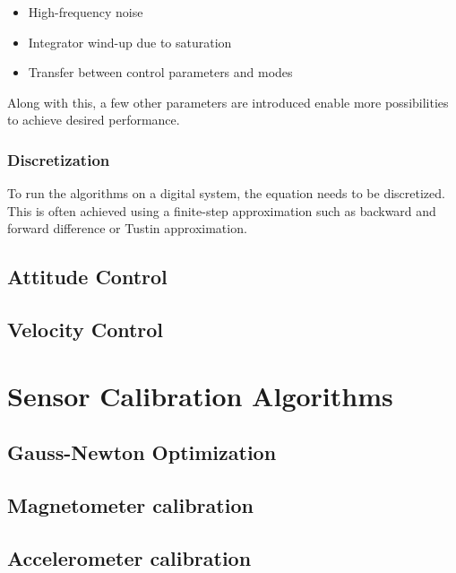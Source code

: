 \documentclass[a4paper]{report}
\begin{document}
\begin{itemize}
\item High-frequency noise
\item Integrator wind-up due to saturation
\item Transfer between control parameters and modes
\end{itemize}

Along with this, a few other parameters are introduced enable more possibilities to achieve desired performance.

	\subsection{Discretization}
To run the algorithms on a digital system, the equation needs to be discretized. This is often achieved using a finite-step approximation such as backward and forward difference or Tustin approximation.

	\section{Attitude Control}

	\section{Velocity Control}

\chapter{Sensor Calibration Algorithms}

	\section{Gauss-Newton Optimization}

	\section{Magnetometer calibration}

	\section{Accelerometer calibration}
\end{document}
